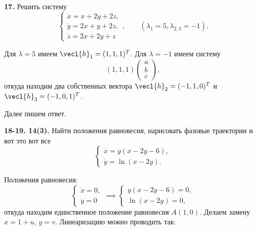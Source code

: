 \begin{task}
    \textbf{17.} Решить систему
    \begin{equation*}
        \begin{cases}
            \dot x = x + 2y + 2z, \\ \dot y = 2x + y + 2z, \\ \dot z = 2x + 2y + z
        \end{cases}, \hspace{2em} (\lambda_1 = 5, \lambda_{2, 3} = -1).
    \end{equation*}
\end{task}

Для $\lambda = 5$ имеем $\vecl{h}_1 = (1, 1, 1)^T$. Для $\lambda = -1$ имеем систему 
\begin{equation*}
    (1, 1, 1)\begin{pmatrix}
        a \\ b \\ c
    \end{pmatrix},
\end{equation*}
откуда находим два собственных вектора $\vecl{h}_2 = (-1, 1, 0)^T$ и $\vecl{h}_3 = (-1, 0, 1)^T$.

Далее пишем ответ.

\begin{task}
    \textbf{18-19. 14(3).} Найти положения равновесия, нарисовать фазовые траектории и вот это вот все 
    \begin{equation*}
        \begin{cases}
            \dot x = y(x - 2y - 6), \\ \dot y = \ln (x - 2y).
        \end{cases}
    \end{equation*}
\end{task}

Положения равновесия:
\begin{equation*}
    \begin{cases}
        \dot x = 0, \\ \dot y = 0
    \end{cases} \implies \begin{cases}
        y(x - 2y - 6) = 0, \\ \ln(x - 2y) = 0,
    \end{cases}
\end{equation*}
откуда находим единственное положение равновесия $A(1, 0)$. Делаем замену $x = 1 + u$, $y = v$. Линеаризацию можно проводить так:

